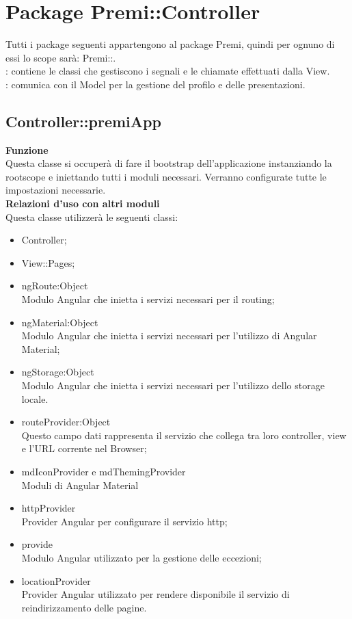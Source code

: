 \section{Package Premi::\-Controller}{
	\label{sec:controller}
	Tutti i package seguenti appartengono al package Premi, quindi per ognuno di essi lo scope sarà: Premi::.\\
	\textbf{\tipo}: contiene le classi che gestiscono i segnali e le chiamate effettuati dalla View.\\
	\textbf{\relaz}: comunica con il Model per la gestione del profilo e delle presentazioni.\\

	\subsection{Controller::\-premiApp}{
		\label{sec:premiapp}
		\textbf{Funzione}\\
		\indent Questa classe si occuperà di fare il bootstrap dell'applicazione instanziando la rootscope  e iniettando tutti i moduli necessari. Verranno configurate tutte le impostazioni necessarie.\\
		\textbf{Relazioni d'uso con altri moduli}\\
		\indent Questa classe utilizzerà le seguenti classi:
		\begin{itemize}
			\item Controller;
			\item View::Pages;
			\item ngRoute:Object\\
				\indent Modulo Angular che inietta i servizi necessari per il routing;
			\item ngMaterial:Object\\
				\indent Modulo Angular che inietta i servizi necessari per l'utilizzo di Angular Material;
			\item ngStorage:Object\\
				\indent Modulo Angular che inietta i servizi necessari per l'utilizzo dello storage locale.
			\item \textdollar routeProvider:Object\\
				\indent Questo campo dati rappresenta il servizio che collega tra loro controller, view e l'URL corrente nel Browser;
			\item \textdollar mdIconProvider e \textdollar mdThemingProvider\\
				\indent Moduli di Angular Material
			\item \textdollar httpProvider\\
				\indent Provider Angular per configurare il servizio http;
			\item \textdollar provide\\
				\indent Modulo Angular utilizzato per la gestione delle eccezioni;
			\item \textdollar locationProvider\\
				\indent Provider Angular utilizzato per rendere disponibile il servizio di reindirizzamento delle pagine.
		\end{itemize}
	}

}
